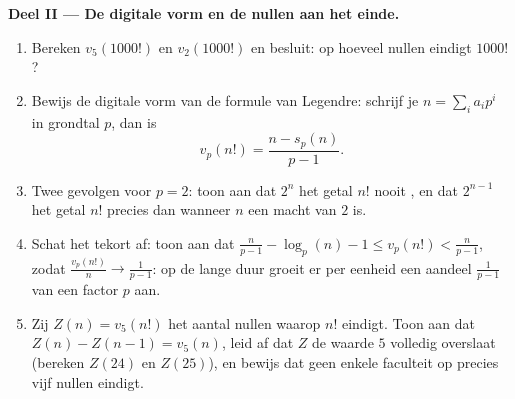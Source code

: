 \begin{problem}
\medskip
\noindent\textbf{Deel II --- De digitale vorm en de nullen aan het
einde.}
\begin{enumerate}[resume]
  \item Bereken $v_5(1000!)$ en $v_2(1000!)$ en besluit: op hoeveel
        nullen eindigt $1000!$?
  \item Bewijs de digitale vorm van de formule van Legendre: schrijf je
        $n = \sum_i a_i p^i$ in grondtal $p$, dan is
        \[
        v_p(n!) = \frac{n - s_p(n)}{p - 1} .
        \]
  \item Twee gevolgen voor $p = 2$: toon aan dat $2^n$ het getal $n!$
        nooit , en dat $2^{n-1}$ het getal $n!$ precies dan 
        wanneer $n$ een macht van $2$ is.
  \item Schat het tekort af: toon aan dat $\frac n{p-1} - \log_p(n) - 1
        \leq v_p(n!) < \frac n{p-1}$, zodat $\frac{v_p(n!)}{n} \to
        \frac1{p-1}$: op de lange duur groeit er per eenheid een aandeel
        $\frac1{p-1}$ van een factor $p$ aan.
  \item Zij $Z(n) = v_5(n!)$ het aantal nullen waarop $n!$ eindigt. Toon
        aan dat $Z(n) - Z(n-1) = v_5(n)$, leid af dat $Z$ de waarde $5$
        volledig overslaat (bereken $Z(24)$ en $Z(25)$), en bewijs dat
        geen enkele faculteit op precies vijf nullen eindigt.
\end{enumerate}


\end{problem}
